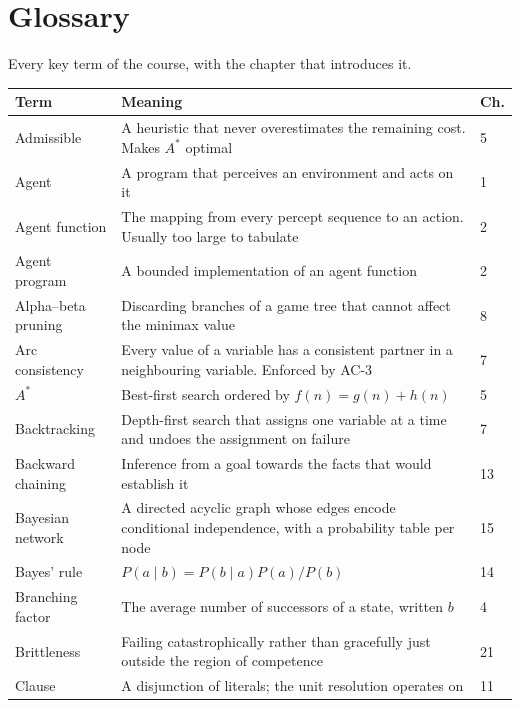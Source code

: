 \chapter{Glossary}\label{app:glossary}
\normalfigures

Every key term of the course, with the chapter that introduces it.

\begin{longtable}{@{}L{3.6cm}L{10.2cm}L{1.0cm}@{}}
\toprule
{}
\textbf{Term} & \textbf{Meaning} & \textbf{Ch.} \\
\midrule
\endhead
Admissible & A heuristic that never overestimates the remaining cost. Makes
$A^{*}$ optimal & 5 \\
Agent & A program that perceives an environment and acts on it & 1 \\
Agent function & The mapping from every percept sequence to an action. Usually
too large to tabulate & 2 \\
Agent program & A bounded implementation of an agent function & 2 \\
Alpha--beta pruning & Discarding branches of a game tree that cannot affect the
minimax value & 8 \\
Arc consistency & Every value of a variable has a consistent partner in a
neighbouring variable. Enforced by AC-3 & 7 \\
$A^{*}$ & Best-first search ordered by $f(n) = g(n) + h(n)$ & 5 \\
Backtracking & Depth-first search that assigns one variable at a time and undoes
the assignment on failure & 7 \\
Backward chaining & Inference from a goal towards the facts that would establish
it & 13 \\
Bayesian network & A directed acyclic graph whose edges encode conditional
independence, with a probability table per node & 15 \\
Bayes' rule & $P(a \mid b) = P(b \mid a)P(a)/P(b)$ & 14 \\
Branching factor & The average number of successors of a state, written $b$ & 4 \\
Brittleness & Failing catastrophically rather than gracefully just outside the
region of competence & 21 \\
Clause & A disjunction of literals; the unit resolution operates on & 11 \\

\end{longtable}
